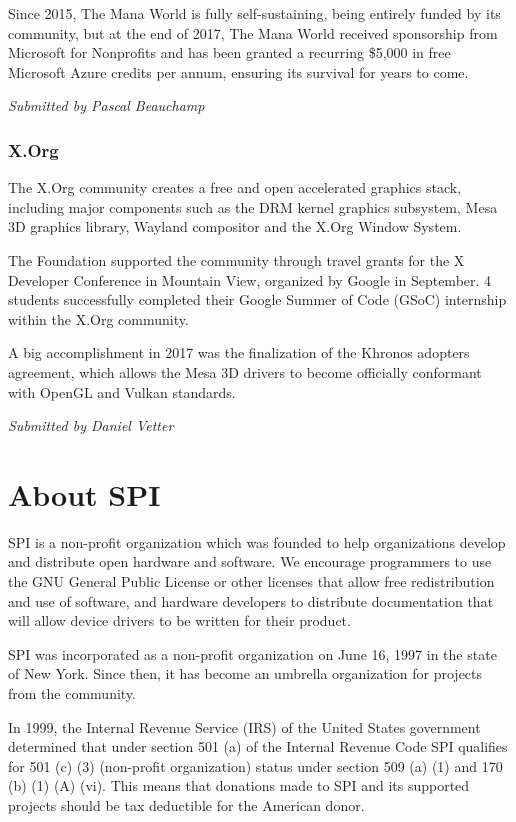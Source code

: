 \documentclass[a4paper]{report}
\begin{document}
Since 2015, The Mana World is fully self-sustaining, being entirely
funded by its community, but at the end of 2017, The Mana World received
sponsorship from Microsoft for Nonprofits and has been granted a
recurring \$5,000 in free Microsoft Azure credits per annum, ensuring
its survival for years to come.

{\em Submitted by Pascal Beauchamp}

\subsection{X.Org}

The X.Org community creates a free and open accelerated graphics stack,
including major components such as the DRM kernel graphics subsystem,
Mesa 3D graphics library, Wayland compositor and the X.Org Window
System.

The Foundation supported the community through travel grants for the X
Developer Conference in Mountain View, organized by Google in September.
4 students successfully completed their Google Summer of Code (GSoC)
internship within the X.Org community.

A big accomplishment in 2017 was the finalization of the Khronos
adopters agreement, which allows the Mesa 3D drivers to become
officially conformant with OpenGL and Vulkan standards.

{\em Submitted by Daniel Vetter}


\appendix
\chapter{About SPI}

SPI is a non-profit organization which was founded to help organizations
develop and distribute open hardware and software. We encourage programmers
to use the GNU General Public License or other licenses that allow free
redistribution and use of software, and hardware developers to distribute
documentation that will allow device drivers to be written for their product.

SPI was incorporated as a non-profit organization on June 16, 1997 in the state
of New York. Since then, it has become an umbrella organization for projects
from the community.

In 1999, the Internal Revenue Service (IRS) of the United States government
determined that under section 501 (a) of the Internal Revenue Code SPI
qualifies for 501 (c) (3) (non-profit organization) status under section 509
(a) (1) and 170 (b) (1) (A) (vi). This means that donations made to SPI and its
supported projects should be tax deductible for the American donor.
\end{document}
